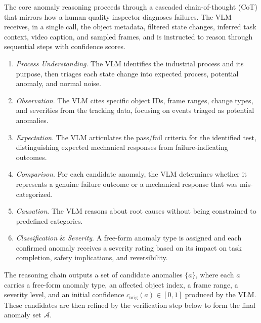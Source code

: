\documentclass[runningheads]{llncs}
\begin{document}
The core anomaly reasoning proceeds through a cascaded chain-of-thought (CoT) that mirrors how a human quality inspector diagnoses failures.
The VLM receives, in a single call, the object metadata, filtered state changes, inferred task context, video caption, and sampled frames, and is instructed to reason through sequential steps with confidence scores. 
\begin{enumerate}
    \item \textit{Process Understanding}. The VLM identifies the industrial process and its purpose, then triages each state change into expected process, potential anomaly, and normal noise. 
    
    \item \textit{Observation}. The VLM cites specific object IDs, frame ranges, change types, and severities from the tracking data, focusing on events triaged as potential anomalies.

    \item {\textit{Expectation}.} The VLM articulates the pass/fail criteria for the identified test, distinguishing expected mechanical responses from failure-indicating outcomes.

    \item {\textit{Comparison}.} For each candidate anomaly, the VLM determines whether it represents a genuine failure outcome or a mechanical response that was mis-categorized.

    \item {\textit{Causation}}. The VLM reasons about root causes without being constrained to predefined categories.

    \item {\textit{Classification} \& \textit{Severity}.} A free-form anomaly type is assigned and each confirmed anomaly receives a severity rating based on its impact on task completion, safety implications, and reversibility.

\end{enumerate}


The reasoning chain outputs a set of candidate anomalies $\{a\}$, where each $a$ carries a free-form anomaly type, an affected object index, a frame range, a severity level, and an initial confidence $c_{\text{orig}}(a)\in[0,1]$ produced by the VLM. These candidates are then refined by the verification step below to form the final anomaly set $\mathcal{A}$.
\end{document}
